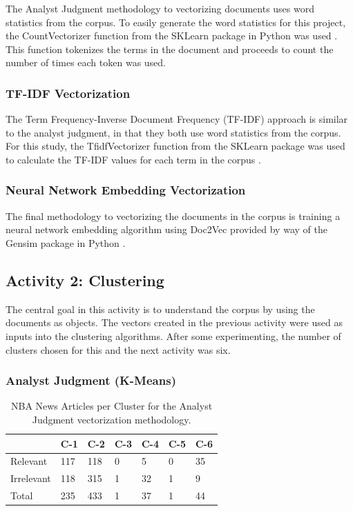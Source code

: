 \documentclass[5p,authoryear]{elsarticle}
\begin{document}
The Analyst Judgment methodology to vectorizing documents uses word statistics from the corpus. 
To easily generate the word statistics for this project, the CountVectorizer function from the SKLearn package in Python was used \citep{countVec}.
This function tokenizes the terms in the document and proceeds to count the number of times each token was used.


\subsubsection{TF-IDF Vectorization}\label{tfidf}

The Term Frequency-Inverse Document Frequency (TF-IDF) approach is similar to the analyst judgment, in that they both use word statistics from the corpus. 
For this study, the TfidfVectorizer function from the SKLearn package was used to calculate the TF-IDF values for each term in the corpus \citep{tfidf}. 


\subsubsection{Neural Network Embedding Vectorization}\label{exploration}

The final methodology to vectorizing the documents in the corpus is training a neural network embedding algorithm using Doc2Vec provided by way of the Gensim package in Python \citep{gensim}. 


\subsection{Activity 2: Clustering}\label{two}

The central goal in this activity is to understand the corpus by using the documents as objects. 
The vectors created in the previous activity were used as inputs into the clustering algorithms. 
After some experimenting, the number of clusters chosen for this and the next activity was six. 


\subsubsection{Analyst Judgment (K-Means)}\label{judge}

\begin{table}[!htb] 
  \centering 
  \begin{tabular}{@{\small}lllllll@{}} 
    \toprule %
    & {\footnotesize C-1} &  {\footnotesize C-2} & {\footnotesize  C-3} & {\footnotesize  C-4} & {\footnotesize  C-5} & {\footnotesize  C-6} \\ \midrule
    Relevant & 117 & 118 & 0 & 5 & 0 & 35 \\
    Irrelevant & 118 & 315 & 1 & 32 & 1 & 9 \\
    Total & 235 & 433 & 1 & 37 & 1 & 44 \\
    \bottomrule
\end{tabular} \caption{NBA News Articles per Cluster for the Analyst Judgment vectorization methodology.} \label{table_eval}
\end{table}
\end{document}
